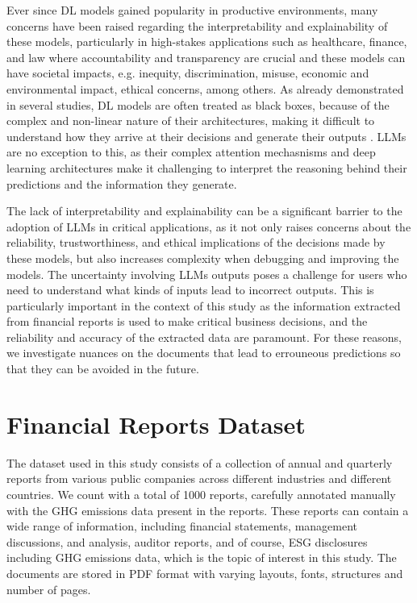 \documentclass[english, 12pt, a4paper, elec, utf8, a-2b, online]{aaltothesis}
\begin{document}
Ever since \ac{DL} models gained popularity in productive environments, many concerns have been raised regarding the interpretability and explainability of these models, particularly in high-stakes applications such as healthcare, finance, and law where accountability and transparency are crucial and these models can have societal impacts, e.g. inequity, discrimination, misuse, economic and environmental impact, ethical concerns, among others.
As already demonstrated in several studies, \ac{DL} models are often treated as black boxes, because of the complex and non-linear nature of their architectures, making it difficult to understand how they arrive at their decisions and generate their outputs \cite{castelvecchi2016can, 2018_survey_explaining_black_box}.
\ac{LLM}s are no exception to this, as their complex attention mechasnisms and deep learning architectures make it challenging to interpret the reasoning behind their predictions and the information they generate.

The lack of interpretability and explainability can be a significant barrier to the adoption of \ac{LLM}s in critical applications, as it not only raises concerns about the reliability, trustworthiness, and ethical implications of the decisions made by these models, but also increases complexity when debugging and improving the models.
The uncertainty involving \ac{LLM}s outputs poses a challenge for users who need to understand what kinds of inputs lead to incorrect outputs.
This is particularly important in the context of this study as the information extracted from financial reports is used to make critical business decisions, and the reliability and accuracy of the extracted data are paramount.
For these reasons, we investigate nuances on the documents that lead to errouneous predictions so that they can be avoided in the future.

\clearpage

\section{Financial Reports Dataset}

The dataset used in this study consists of a collection of annual and quarterly reports from various public companies across different industries and different countries.
We count with a total of 1000 reports, carefully annotated manually with the \ac{GHG} emissions data present in the reports.
These reports can contain a wide range of information, including financial statements, management discussions, and analysis, auditor reports, and of course, \ac{ESG} disclosures including \ac{GHG} emissions data, which is the topic of interest in this study.
The documents are stored in \ac{PDF} format with varying layouts, fonts, structures and number of pages.
\end{document}
